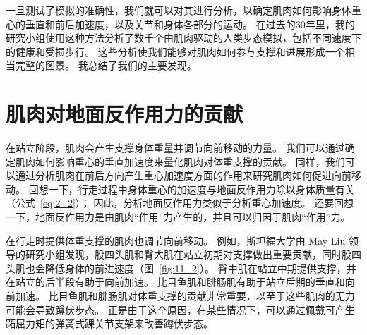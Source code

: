 一旦测试了模拟的准确性，我们就可以对其进行分析，以确定肌肉如何影响身体重心的垂直和前后加速度，以及关节和身体各部分的运动。
在过去的30年里，我的研究小组使用这种方法分析了数千个由肌肉驱动的人类步态模拟，包括不同速度下的健康和受损步行。
这些分析使我们能够对肌肉如何参与支撑和进展形成一个相当完整的图景。
我总结了我们的主要发现。


\section{肌肉对地面反作用力的贡献}

在站立阶段，肌肉会产生支撑身体重量并调节向前移动的力量。
我们可以通过确定肌肉如何影响重心的垂直加速度来量化肌肉对体重支撑的贡献。
同样，我们可以通过分析肌肉在前后方向产生重心加速度方面的作用来研究肌肉如何促进向前移动。
回想一下，行走过程中身体重心的加速度与地面反作用力除以身体质量有关（公式~\ref{eq:2_2}）；
因此，分析地面反作用力类似于分析重心加速度。
还要回想一下，地面反作用力是由肌肉“作用”力产生的，并且可以归因于肌肉“作用”力。


在行走时提供体重支撑的肌肉也调节向前移动。
例如，斯坦福大学由 May Liu 领导的研究小组发现，股四头肌和臀大肌在站立初期对支撑做出重要贡献，同时股四头肌也会降低身体的前进速度（图~\ref{fig:11_2}）。
臀中肌在站立中期提供支撑，并在站立的后半段有助于向前加速。
比目鱼肌和腓肠肌有助于站立后期的垂直和向前加速。
比目鱼肌和腓肠肌对体重支撑的贡献非常重要，以至于这些肌肉的无力可能会导致蹲伏步态。
正是由于这个原因，在某些情况下，可以通过佩戴可产生跖屈力矩的弹簧式踝关节支架来改善蹲伏步态。


